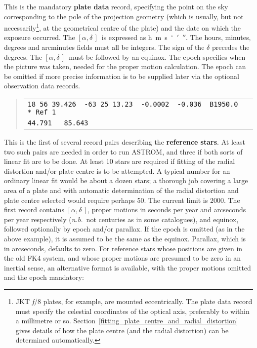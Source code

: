 \documentclass[twoside,11pt]{article}
\renewcommand{\_}{\texttt{\symbol{95}}}
\newcommand{\radec}     {$[\alpha,\delta\,]$}
\begin{document}
This is the mandatory \textbf{plate data} record, specifying the
point on the sky corresponding to the pole of the projection
geometry (which is usually, but not necessarily\footnote{JKT
\textit{f}/8 plates, for example, are mounted eccentrically.
The plate data record must specify the celestial coordinates
of the optical axis, preferably to within a millimetre or so.
Section~\ref{fitting_plate_centre_and_radial_distortion} gives details
of how the plate centre (and the radial distortion) can be determined
automatically.}, at the geometrical centre of the plate) and the
date on which the exposure occurred.  The \radec\ is expressed as
h~m~s~$^\circ$~$'$~$''$.  The hours, minutes, degrees and arcminutes
fields must all be integers.  The sign of the $\delta$ precedes the
degrees.  The \radec\ must be followed by an equinox.  The epoch specifies
when the picture was taken, needed for the proper motion calculation.
The epoch can be omitted if more precise information is to be supplied
later via the optional observation data records.

\goodbreak
\begin{quote}
\begin{tabular}{|l|}
\hline
\verb|18 56 39.426  -63 25 13.23  -0.0002  -0.036  B1950.0  * Ref 1| \\
\verb|44.791   85.643| \\
\hline
\end{tabular}
\end{quote}

This is the first of several record pairs describing the \textbf{reference
stars}.  At least two such pairs are needed in order to run ASTROM,
and three if both sorts of linear fit are to be done.  At least 10 stars
are required if fitting of the radial distortion and/or plate centre is
to be attempted.  A typical number for an ordinary linear fit would be
about a dozen stars; a thorough job covering a large area of a plate
and with automatic determination of the radial distortion and plate
centre selected would require perhaps 50.  The current limit is 2000.
The first record contains \radec, proper motions in seconds per year and
arcseconds per year respectively (\textit{n.b.}\ not centuries as in some
catalogues), and equinox, followed optionally by epoch and/or parallax.
If the epoch is omitted (as in the above example), it is assumed to be the
same as the equinox.  Parallax, which is in arcseconds, defaults to zero.
For reference stars whose positions are given in the old FK4 system,
and whose proper motions are presumed to be zero in an inertial sense,
an alternative format is available, with the proper motions omitted and
the epoch mandatory:
\end{document}
